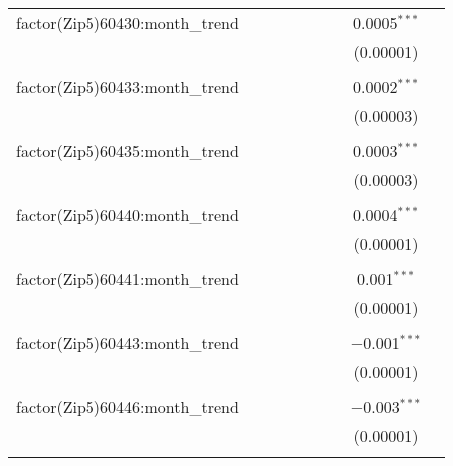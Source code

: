 \begin{table}[H]
{\begin{tabular}{@{\extracolsep{5pt}}lcccccccc}
  factor(Zip5)60430:month\_trend &  &  &  &  &  &  & 0.0005$^{***}$ &  \\  

   &  &  &  &  &  &  & (0.00001) &  \\  

   & & & & & & & & \\  

  factor(Zip5)60433:month\_trend &  &  &  &  &  &  & 0.0002$^{***}$ &  \\  

   &  &  &  &  &  &  & (0.00003) &  \\  

   & & & & & & & & \\  

  factor(Zip5)60435:month\_trend &  &  &  &  &  &  & 0.0003$^{***}$ &  \\  

   &  &  &  &  &  &  & (0.00003) &  \\  

   & & & & & & & & \\  

  factor(Zip5)60440:month\_trend &  &  &  &  &  &  & 0.0004$^{***}$ &  \\  

   &  &  &  &  &  &  & (0.00001) &  \\  

   & & & & & & & & \\  

  factor(Zip5)60441:month\_trend &  &  &  &  &  &  & 0.001$^{***}$ &  \\  

   &  &  &  &  &  &  & (0.00001) &  \\  

   & & & & & & & & \\  

  factor(Zip5)60443:month\_trend &  &  &  &  &  &  & $-$0.001$^{***}$ &  \\  

   &  &  &  &  &  &  & (0.00001) &  \\  

   & & & & & & & & \\  

  factor(Zip5)60446:month\_trend &  &  &  &  &  &  & $-$0.003$^{***}$ &  \\  

   &  &  &  &  &  &  & (0.00001) &  \\  

   & & & & & & & & \\  


\end{tabular}}
\end{table}
